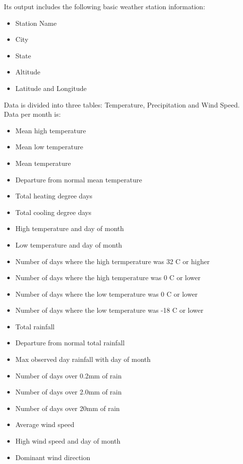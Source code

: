 \documentclass[a4paper,10pt]{book}
\begin{document}
Its output includes the following basic weather station information:
\begin{itemize}
\item Station Name
\item City
\item State
\item Altitude
\item Latitude and Longitude
\end{itemize}

Data is divided into three tables: Temperature, Precipitation and Wind Speed. Data per month is:
\begin{itemize}
\item Mean high temperature
\item Mean low temperature
\item Mean temperature
\item Departure from normal mean temperature
\item Total heating degree days
\item Total cooling degree days
\item High temperature and day of month
\item Low temperature and day of month
\item Number of days where the high termperature was 32 \degree C or higher
\item Number of days where the high temperature was 0 \degree C or lower
\item Number of days where the low temperature was 0 \degree C or lower
\item Number of days where the low temperature was -18 \degree C or lower
\item Total rainfall
\item Departure from normal total rainfall
\item Max observed day rainfall with day of month
\item Number of days over 0.2mm of rain
\item Number of days over 2.0mm of rain
\item Number of days over 20mm of rain
\item Average wind speed
\item High wind speed and day of month
\item Dominant wind direction
\end{itemize}
\end{document}
